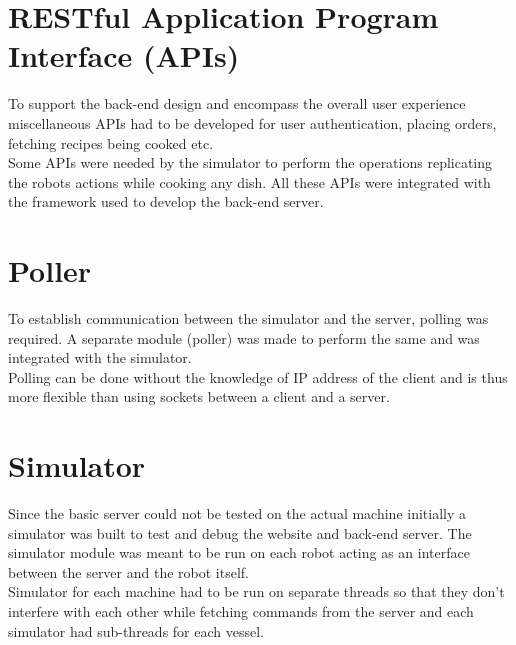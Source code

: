 \section{ RESTful Application Program Interface (APIs) }
{ \normalsize To support the back-end design and encompass the overall user experience miscellaneous APIs had to be developed for user authentication, placing orders, fetching recipes being cooked etc. \\[0.1in]
Some APIs were needed by the simulator to perform the operations replicating the robots actions while cooking any dish. All these APIs were integrated with the framework used to develop the back-end server.
}
\section{ Poller }
{ \normalsize To establish communication between the simulator and the server, polling was required. A separate module (poller) was made to perform the same and was integrated with the simulator. \\[0.1in]
Polling can be done without the knowledge of IP address of the client and is thus more flexible than using sockets between a client and a server.\\[0.1in]
}
\section{ Simulator }
{
Since the basic server could not be tested on the actual machine initially a simulator was built to test and debug the website and back-end server. The simulator module was meant to be run on each robot acting as an interface between the server and the robot itself. \\[0.1in]
Simulator for each machine had to be run on separate threads so that they don't interfere with each other while fetching commands from the server and each simulator had sub-threads for each vessel. 
}